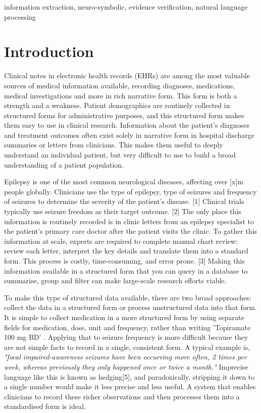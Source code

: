 \documentclass[conference]{IEEEtran}
\begin{document}
\begin{IEEEkeywords}
information extraction, neuro-symbolic, evidence verification, 
natural language processing
\end{IEEEkeywords}

\section{Introduction}

Clinical notes in electronic health records (EHRs) are 
among the most valuable sources of medical information 
available, recording diagnoses, medications, medical 
investigations and more in rich narrative form. This form is 
both a strength and a weakness. Patient demographics are 
routinely collected in structured forms for administrative 
purposes, and this structured form makes them easy to 
use in clinical research. Information about the patient's 
diagnoses and treatment outcomes often exist solely in 
narrative form in hospital discharge summaries or letters 
from clinicians. This makes them useful to deeply 
understand an individual patient, but very difficult to use 
to build a broad understanding of a patient population.

Epilepsy is one of the most common neurological 
diseases, affecting over [x]m people globally. Clinicians use 
the type of epilepsy, type of seizures and frequency of 
seizures to determine the severity of the patient's disease. [1]
Clinical trials typically use seizure freedom as their target 
outcome. [2] The only place this information is routinely 
recorded is in clinic letters from an epilepsy specialist to 
the patient's primary care doctor after the patient visits the 
clinic. To gather this information at scale, experts are 
required to complete manual chart review: review each 
letter, interpret the key details and translate them into a 
standard form. This process is costly, time-consuming, 
and error prone. [3] Making this information available in a 
structured form that you can query in a database to 
summarise, group and filter can make large-scale
research efforts viable.

To make this type of structured data available, there are
two broad approaches: collect the data in a structured 
form or process unstructured data into that form. It is 
simple to collect medication in a more structured form by 
using separate fields for medication, dose, unit and 
frequency, rather than writing 'Topiramate 100 mg BD' . 
Applying that to seizure frequency is more difficult 
because they are not simple facts to record in a single,
consistent form. A typical example is, \emph{"focal 
impaired-awareness seizures have been occurring 
more often, 2 times per week, whereas previously 
they only happened once or twice a month."} 
Imprecise language like this is known as hedging[5], 
and paradoxically, stripping it down to a single number 
would make it less precise and less useful. A system 
that enables clinicians to record these richer 
observations and then processes them into a 
standardised form is ideal.
\end{document}
